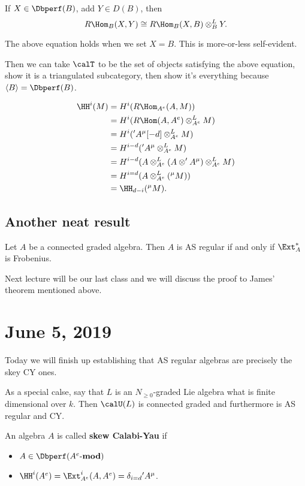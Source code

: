 \documentclass[12pt]{article}
\begin{document}
\begin{lem}\label{lem-useful}
	If $X\in\Dbperf(B)$, add $Y\in D(B)$, then 
	\[R\Hom_B(X,Y)\cong R\Hom_B(X,B)\otimes_B^LY.\]
\end{lem}
\begin{prf}
	The above equation holds when we set $X=B$. This is more-or-less self-evident.

	Then we can take $\calT$ to be the set of objects satisfying the above equation, show it is a triangulated subcategory, then show it's everything 
	because $\langle B\rangle=\Dbperf(B)$.
\end{prf}
\begin{prf}
	\begin{align*}
		\HH^i(M)&=H^i(R\Hom_{A^e}(A,M))\\
		&=H^i(R\Hom(A,A^e)\otimes_{A^e}^LM)\\
		&=H^i('A^\mu[-d]\otimes_{A^e}^LM)\\
		&=H^{i-d}('A^\mu\otimes_{A^e}^LM)\\
		&=H^{i-d}(A\otimes_{A^e}^L(A\otimes 'A^\mu)\otimes_{A^e}^LM)\\
		&=H^{i=d}(A\otimes_{A^e}^L({^\mu}M))\\
		&=\HH_{d-i}(^{\mu}M).
	\end{align*}
\end{prf}
\subsection{Another neat result}
\begin{thm}[S. P. Smith]
	Let $A$ be a connected graded algebra. Then $A$ is AS regular if and only if $\Ext_A^\ast$ is Frobenius.
\end{thm}

Next lecture will be our last class and we will discuss the proof to James' theorem mentioned above.

\section{June 5, 2019}
Today we will finish up establishing that AS regular algebras are precisely the skey CY ones.

As a special calse, say that $L$ is an $N_{\ge 0}$-graded Lie algebra what is finite dimensional over $k$. Then $\calU(L)$ is connected graded and 
furthermore is AS regular and CY.

\begin{defn}
	An algebra $A$ is called \textbf{skew Calabi-Yau} if 
	\begin{itemize}
		\item $A\in\Dbperf(A^{e}\text{-}\mathbf{mod})$
		\item $\HH^i(A^e)=\Ext_{A^e}^i(A,A^e)=\delta_{i=d}{'}A^\mu$.
	\end{itemize}
\end{defn}
\end{document}
